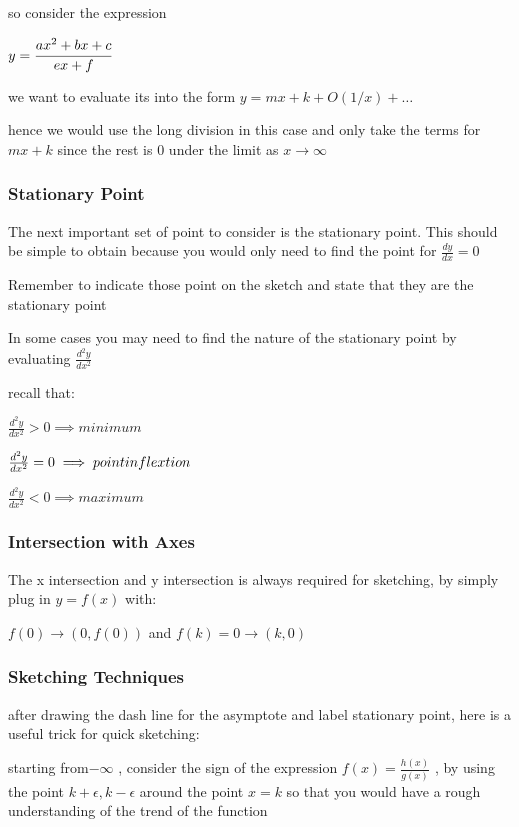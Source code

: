 \documentclass[]{article}
\begin{document}
so consider the expression

\(y = \cfrac{ax^2 + bx + c}{ex+f}\)

we want to evaluate its into the form \(y = mx + k + O(1/x)  +\dots\)

hence we would use the long division in this case and only take the
terms for \(mx + k\) since the rest is 0 under the limit as
\(x \rightarrow \infty\)

\subsubsection{Stationary Point}\label{header-n1127}

The next important set of point to consider is the stationary point.
This should be simple to obtain because you would only need to find the
point for \(\frac{dy}{dx} = 0\)

Remember to indicate those point on the sketch and state that they are
the stationary point

In some cases you may need to find the nature of the stationary point by
evaluating \(\frac{d^2y}{dx^2}\)

recall that:

\(\frac{d^2y}{dx^2} > 0 \implies minimum\)

\(\frac{d^2y}{dx^2} = 0 \implies point \space inflextion\)

\(\frac{d^2y}{dx^2} < 0 \implies maximum\)

\subsubsection{Intersection with Axes}\label{header-n1142}

The x intersection and y intersection is always required for sketching,
by simply plug in \(y=f(x)\) with:

\(f(0) \rightarrow (0,f(0))\) and \(f(k) = 0 \rightarrow (k,0)\)

\subsubsection{Sketching Techniques}\label{header-n1147}

after drawing the dash line for the asymptote and label stationary
point, here is a useful trick for quick sketching:

starting from\(-\infty\) , consider the sign of the expression
\(f(x) = \frac{h(x)}{g(x)}\) , by using the point
\(k+\epsilon, k-\epsilon\) around the point \(x = k\) so that you would
have a rough understanding of the trend of the function
\end{document}
